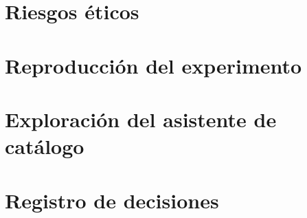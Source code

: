 \documentclass[11pt,twoside]{thesis}
\begin{document}
\chapter{Riesgos éticos}
\label{cap:riesgos}





\appendix
\renewcommand{\appendixname}{Anexo}
\chapter{Reproducción del experimento}

\chapter{Exploración del asistente de catálogo}

\chapter{Registro de decisiones}


\end{document}
